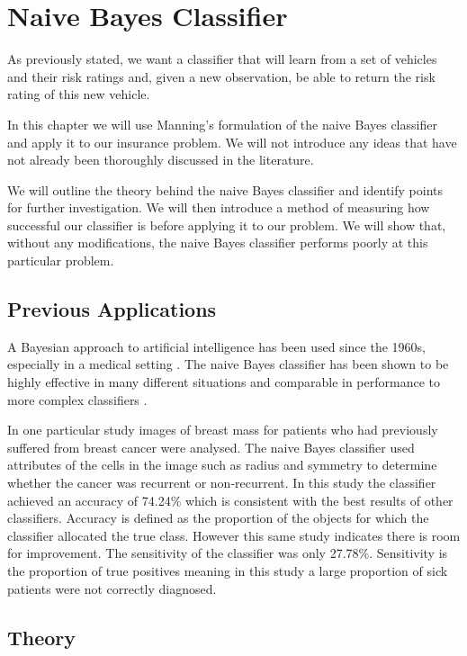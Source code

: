 \chapter{Naive Bayes Classifier}

As previously stated, we want a classifier that will learn from a set of vehicles and their risk ratings and, given a new observation, be able to return the risk rating of this new vehicle.

In this chapter we will use Manning's \cite{Manning08} formulation of the naive Bayes classifier and apply it to our insurance problem.
We will not introduce any ideas that have not already been thoroughly discussed in the literature.

We will outline the theory behind the naive Bayes classifier and identify points for further investigation.
We will then introduce a method of measuring how successful our classifier is before applying it to our problem.
We will show that, without any modifications, the naive Bayes classifier performs poorly at this particular problem.

\section{Previous Applications}
A Bayesian approach to artificial intelligence has been used since the 1960s, especially in a medical setting \cite{Russell03}.
The naive Bayes classifier has been shown to be highly effective in many different situations and comparable in performance to more complex classifiers \cite{Ashari13}.

In one particular study \cite{Dumitru09} images of breast mass for patients who had previously suffered from breast cancer were analysed.
The naive Bayes classifier used attributes of the cells in the image such as radius and symmetry to determine whether the cancer was recurrent or non-recurrent.
In this study the classifier achieved an accuracy of 74.24\% which is consistent with the best results of other classifiers.
Accuracy is defined as the proportion of the objects for which the classifier allocated the true class.
However this same study indicates there is room for improvement.
The sensitivity of the classifier was only 27.78\%.
Sensitivity is the proportion of true positives meaning in this study a large proportion of sick patients were not correctly diagnosed.

\section{Theory}

